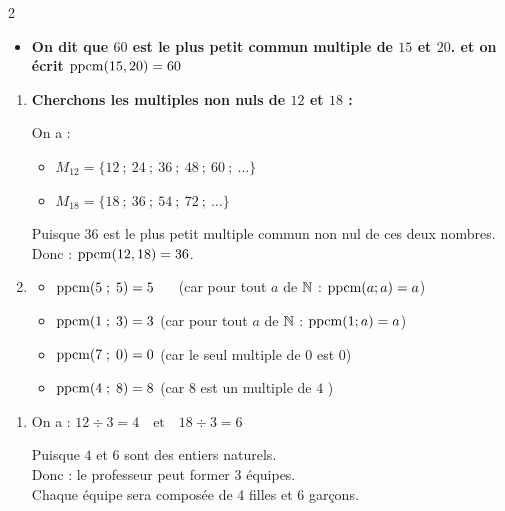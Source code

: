 \documentclass[10pt, a4paper]{article}
\begin{document}
\begin{multicols*}{2}
\begin{Solution}[ACTIVITÉ][4]
\begin{enumerate}[leftmargin=*,itemsep=0.5pt]
    \begin{itemize}[label=$\blacktriangleright$, leftmargin=*, nosep]
    \item \textbf{On dit que $60$ est le \textcolor{PrimaryColor}{plus petit commun multiple}  de $15$ et $20$. et on écrit $\operatorname{ppcm}(15, 20) = 60$}
    \end{itemize}
\end{enumerate}
\end{Solution}

\begin{Solution}[APPLICATION][10]
\begin{enumerate}[leftmargin=*,itemsep=0.5pt]
    \item \textbf{Cherchons les multiples non nuls de $12$ et $18$ :}

    On a : 
    \begin{itemize}[leftmargin=*,itemsep=0.5pt]
        \item $M_{12} = \big\{12~;~24~;~36~;~48~;~60~;~\dots\big\}$
        \item $M_{18} = \big\{18~;~36~;~54~;~72~;~\dots\big\}$ 
    \end{itemize}
    Puisque $36$ est le plus petit multiple commun non nul de ces deux nombres. 
    Donc : \quad $\operatorname{ppcm}(12, 18) = 36$.
    \item
    \begin{itemize}[leftmargin=*,itemsep=0.5pt]
        \item $\operatorname{ppcm}(5 \; ; \; 5) = 5$ ~~
        (car pour tout $a$ de $\mathbb{N}$ : $\operatorname{ppcm}(a ; a) = a$)
        \item $\operatorname{ppcm}(1 \; ; \; 3) = 3$ \quad
         (car pour tout $a$ de $\mathbb{N}$ : $\operatorname{ppcm}(1 ; a) = a$)
        \item $\operatorname{ppcm}(7 \; ; \; 0) = 0$ \quad
        (car le seul multiple de $0$ est $0$)
        \item $\operatorname{ppcm}(4 \; ; \; 8) = 8$ \quad
        (car $8$ est un multiple de $4$ )
    \end{itemize}

\end{enumerate}
\end{Solution}

\begin{Solution}[ACTIVITÉ][5]
\begin{enumerate}[leftmargin=*,itemsep=0.5pt]
    \item On a : \quad    $12 \div 3 = 4   \quad \text{et}  \quad 18 \div 3 = 6$

    Puisque $4$ et $6$ sont des entiers naturels. \\
    Donc : le professeur peut former 3 équipes. \\
    Chaque équipe sera composée de 4 filles et 6 garçons.


\end{enumerate}
\end{Solution}
\end{multicols*}
\end{document}
